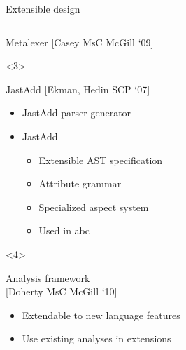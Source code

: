 \begin{frame}[t]{Extensible design}
\begin{columns}[T]
\begin{column}{5cm}
\begin{onlyenv}
\begin{block}{Metalexer {\tiny[Casey MsC McGill `09]}
          \vspace{1ex}}
        \end{block}
      \end{onlyenv}
      \begin{onlyenv}<3>
        \begin{block}{JastAdd {\tiny[Ekman, Hedin SCP `07]}}
          \begin{itemize}
          \item JastAdd parser generator
          \item JastAdd 
            \begin{itemize}
            \item Extensible AST specification
            \item Attribute grammar
            \item Specialized aspect system
            \item Used in abc
            \end{itemize}
          \end{itemize}
        \end{block}
      \end{onlyenv}
      \begin{onlyenv}<4>
        \begin{block}{Analysis framework \\{\tiny[Doherty MsC McGill `10]}}
          \begin{itemize}
          \item Extendable to new language features
          \item Use existing analyses in extensions
          \end{itemize}
        \end{block}
      \end{onlyenv}
    \end{column}
  \end{columns}
\end{frame}
